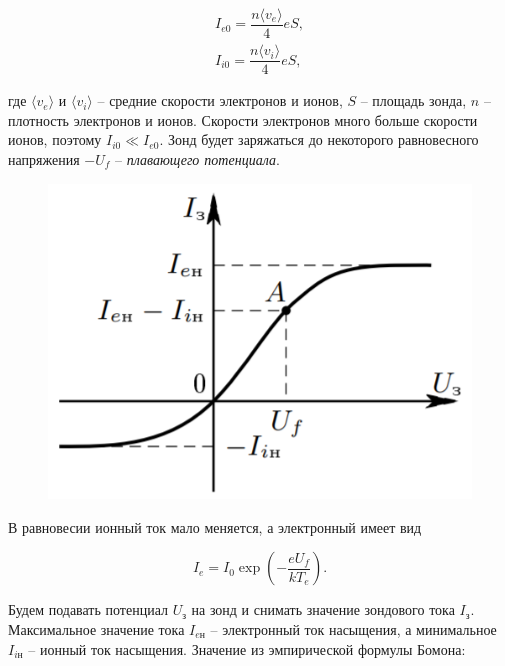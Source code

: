 \documentclass[a4paper, 12pt]{article}
\begin{document}
            \begin{equation}
                \begin{array}{c}
                    I_{e0} = \dfrac{n \langle v_e \rangle}{4}eS,\\
                    I_{i0} = \dfrac{n \langle v_i \rangle}{4}eS,
                \end{array}
            \end{equation}

            где $\langle v_e \rangle$ и $\langle v_i \rangle$ -- средние скорости электронов и ионов, $S$ -- площадь зонда, $n$ -- плотность электронов и ионов. Скорости электронов много больше скорости ионов, поэтому $I_{i0} \ll I_{e0}$. Зонд будет заряжаться до некоторого равновесного напряжения $-U_f$ -- \textit{плавающего потенциала}.

            \begin{figure}
                \includegraphics[scale=0.5]{img/3.png}
            \end{figure}

            В равновесии ионный ток мало меняется, а электронный имеет вид

            $$
                I_e = I_0 \exp\left( -\dfrac{eU_f}{kT_e} \right).
            $$

            Будем подавать потенциал $U_\text{з}$ на зонд и снимать значение зондового тока $I_\text{з}$. Максимальное значение тока $I_{e\text{н}}$ -- электронный ток насыщения, а минимальное $I_{i\text{н}}$ -- ионный ток насыщения. Значение из эмпирической формулы Бомона:
\end{document}
